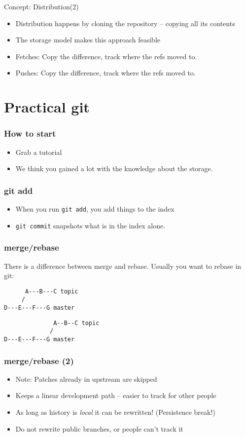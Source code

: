 \documentclass[xcolor=pdftex,dvipsnames]{beamer}
\begin{document}
\begin{frame}{Concept: Distribution(2)}
  \begin{itemize}
  \item Distribution happens by cloning the repository -- copying all
    its contents
  \item The storage model makes this approach feasible
  \item Fetches: Copy the difference, track where the refs moved to.
  \item Pushes:  Copy the difference, track where the refs moved to.
  \end{itemize}
\end{frame}

\section{Practical git}
\begin{frame}
  \frametitle{How to start}
  \begin{itemize}
  \item Grab a tutorial
  \item We think you gained a lot with the knowledge about the
    storage.
  \end{itemize}
\end{frame}

\begin{frame}
  \frametitle{git add}
  \begin{itemize}
  \item When you run \texttt{git add}, you add things to the index
  \item \texttt{git commit} snapshots what is in the index alone.
  \end{itemize}
\end{frame}

\begin{frame}[fragile]
  \frametitle{merge/rebase}
  There is a difference between merge and rebase. Usually you want to
  rebase in git:
\begin{verbatim}
      A---B---C topic
     /
D---E---F---G master
\end{verbatim}
\begin{verbatim}
              A--B--C topic
             /
D---E---F---G master
 \end{verbatim}
\end{frame}

\begin{frame}
  \frametitle{merge/rebase (2)}
  \begin{itemize}
  \item Note: Patches already in upstream are skipped
  \item Keeps a linear development path -- easier to track for other
    people
  \item As long as history is \emph{local} it can be rewritten!
    (Persistence break!)
  \item Do not rewrite public branches, or people can't track it
  \end{itemize}
\end{frame}
\end{document}

